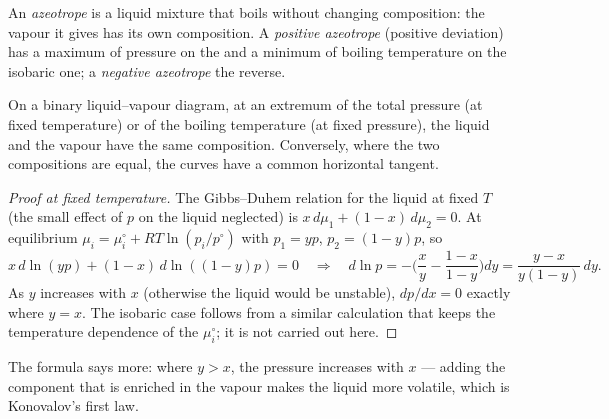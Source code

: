 \begin{definition}[Azeotrope]\label{def:b2:liquid-vapour-diagrams:azeotrope}
An \emph{azeotrope} is a liquid mixture that boils without
changing composition: the vapour it gives has its own composition. A
\emph{positive azeotrope} (positive deviation) has
a maximum of pressure on the  and a minimum of boiling
temperature on the isobaric one; a \emph{negative azeotrope} the reverse.
\end{definition}

\begin{theorem}\label{thm:b2:liquid-vapour-diagrams:konovalov}
On a binary liquid--vapour diagram, at an extremum of the total pressure (at
fixed temperature) or of the boiling temperature (at fixed pressure), the
liquid and the vapour have the same composition. Conversely, where the
two compositions are equal, the curves have a common horizontal tangent.
\end{theorem}

\begin{proof}[Proof at fixed temperature]
The Gibbs--Duhem relation for the liquid at fixed $T$ (the small effect of $p$
on the liquid neglected) is $x\,d\mu_1 + (1 - x)\,d\mu_2 = 0$. At equilibrium
$\mu_i = \mu_i^\circ + RT\ln(p_i/p^\circ)$ with $p_1 = yp$, $p_2 = (1 - y)p$, so
\[
  x\,d\ln(yp) + (1 - x)\,d\ln((1 - y)p) = 0
  \quad\Longrightarrow\quad
  d\ln p = -\Big(\frac{x}{y} - \frac{1 - x}{1 - y}\Big)dy
  = \frac{y - x}{y(1 - y)}\,dy .
\]
As $y$ increases with $x$ (otherwise the liquid would be unstable),
$dp/dx = 0$ exactly where $y = x$. The isobaric case follows from a similar
calculation that keeps the temperature dependence of the $\mu_i^\circ$; it is
not carried out here.
\end{proof}

The formula says more: where $y > x$, the pressure increases with $x$ ---
adding the component that is enriched in the vapour makes the liquid more
volatile, which is Konovalov's first law.

